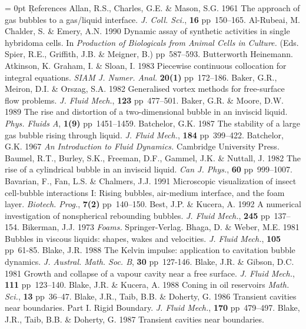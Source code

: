 \parindent = 0pt
\timesrm
\c{\bigrmb References}
\vskip 15pt
Allan, R.S., Charles, G.E. \& Mason, S.G. 1961 The approach of gas bubbles to a 
gas/liquid interface. {\sl J. Coll. Sci.}, {\bf 16} pp~150--165.
\vskip 8pt
Al-Rubeai, M. Chalder, S. \& Emery, A.N. 1990 Dynamic assay of synthetic
activities in single hybridoma cells. In {\sl Production of 
Biologicals from Animal Cells in Culture.} (Eds. Spier, R.E., 
Griffith, J.B. \& Meigner, B.) pp~587--593. Butterworth Heinemann.
\vskip 8pt 
Atkinson, K. Graham, I. \& Sloan, I. 1983 Piecewise continuous collocation
for integral equations. {\sl SIAM J. Numer. Anal.} {\bf 20(1)} pp~172--186.
\vskip 8pt
Baker, G.R., Meiron, D.I. \& Orszag, S.A. 1982 Generalised vortex methods
for free-surface flow problems. {\sl J. Fluid Mech.}, {\bf 123} pp~477--501.
\vskip 8pt
Baker, G.R. \& Moore, D.W. 1989 The rise and distortion of a two-dimensional
bubble in an inviscid liquid. {\sl Phys. Fluids A}, {\bf 1(9)} pp~1451--1459.
\vskip 8pt
Batchelor, G.K. 1987 The stability of a large gas bubble rising 
through liquid. {\sl J. Fluid Mech.}, {\bf 184} pp~399--422.
\vskip 8pt
Batchelor, G.K. 1967 {\sl An Introduction to Fluid Dynamics.} Cambridge
University Press.
\vskip 8pt
Baumel, R.T., Burley, S.K., Freeman, D.F., Gammel, J.K. \& Nuttall, J. 1982
The rise of a cylindrical bubble in an inviscid liquid. {\sl Can J. Phys.},
{\bf 60} pp~999--1007.
\vskip 8pt
Bavarian, F., Fan, L.S. \& Chalmers, J.J. 1991 Microscopic visualization
of insect cell-bubble interactions I: Rising bubbles, air-medium interface, 
and the foam layer. {\sl Biotech. Prog.}, {\bf 7(2)} pp~140--150.
\vskip 8pt
Best, J.P. \& Kucera, A. 1992 A numerical investigation of
nonspherical rebounding bubbles. {\sl J. Fluid Mech.}, {\bf 245} pp~137--154.
\vskip 8pt
Bikerman, J.J. 1973 {\sl Foams.} Springer-Verlag.
\vskip 8pt
Bhaga, D. \& Weber, M.E. 1981 Bubbles in viscous liquids:
shapes, wakes and velocities. {\sl J. Fluid Mech.}, {\bf 105} pp~61-85.
\vskip 8pt
Blake, J.R. 1988 The Kelvin impulse: application to cavitation 
bubble dynamics. {\sl J. Austral. Math. Soc. B}, {\bf 30} pp~127-146.
\vskip 8pt
Blake, J.R. \& Gibson, D.C. 1981 Growth and collapse of a vapour 
cavity near a free surface. {\sl J. Fluid Mech.}, {\bf 111} 
pp~123--140.
\vskip 8pt
Blake, J.R. \& Kucera, A. 1988 Coning in oil reservoirs {\sl Math. Sci.}, {\bf 
13} pp~36--47.
\vskip 8pt
Blake, J.R., Taib, B.B. \& Doherty, G. 1986 Transient cavities near boundaries.
Part I. Rigid Boundary. {\sl J. Fluid Mech.}, {\bf 170} pp~479--497.
\vskip 8pt
Blake, J.R., Taib, B.B. \& Doherty, G. 1987 Transient cavities near boundaries.
